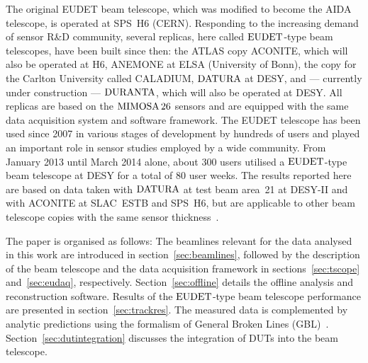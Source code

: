 The original EUDET beam telescope, which was modified to become the AIDA telescope, is operated at SPS~H6 (CERN).
Responding to the increasing demand of sensor R\&D community, several replicas, here called $\textrm{EUDET}$-type beam telescopes, have been built since then:
 the ATLAS copy ACONITE, which will also be operated at H6, ANEMONE at ELSA (University of Bonn), the copy for the Carlton University called CALADIUM, 
 $\textrm{DATURA}$ at DESY, and --- currently under construction --- $\textrm{DURANTA}$, which will also be operated at DESY. 
All replicas are based on the $\textrm{MIMOSA\,26}$ sensors and are equipped with the same data acquisition system and software framework. 
The EUDET telescope has been used since 2007 in various stages of development by hundreds of users and played an important role in sensor studies employed by a wide community. 
From January 2013 until March 2014 alone, about 300 users utilised a $\textrm{EUDET}$-type beam telescope at DESY for a total of 80 user weeks. 
The results reported here are based on data taken with $\textrm{DATURA}$ at test beam area~21 at {DESY-II} and with ACONITE at SLAC~ESTB and SPS~H6, but are applicable to other beam telescope copies with
the same sensor thickness~\cite{desy-tscopes-main}. 

The paper is organised as follows: 
The beamlines relevant for the data analysed in this work are introduced in section~\ref{sec:beamlines}, followed by the description of the beam telescope
 and the data acquisition framework in sections~\ref{sec:tscope} and~\ref{sec:eudaq}, respectively.
Section~\ref{sec:offline} details the offline analysis and reconstruction software. 
Results of the $\textrm{EUDET}$-type beam telescope performance are presented in section~\ref{sec:trackres}. %
The measured data is complemented by analytic predictions using the formalism of General Broken Lines (GBL)~\cite{Blobel20111760,Kleinwort-2012}.
Section~\ref{sec:dutintegration} discusses the integration of DUTs into the beam telescope. 
